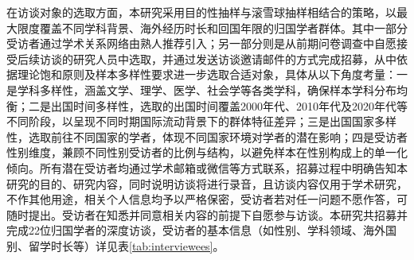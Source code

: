 在访谈对象的选取方面，本研究采用目的性抽样与滚雪球抽样相结合的策略，以最大限度覆盖不同学科背景、海外经历时长和回国年限的归国学者群体。其中一部分受访者通过学术关系网络由熟人推荐引入；另一部分则是从前期问卷调查中自愿接受后续访谈的研究人员中选取，并通过发送访谈邀请邮件的方式完成招募，从中依据理论饱和原则及样本多样性要求进一步选取合适对象，具体从以下角度考量：一是学科多样性，涵盖文学、理学、医学、社会学等各类学科，确保样本学科分布均衡；二是出国时间多样性，选取的出国时间覆盖2000年代、2010年代及2020年代等不同阶段，以呈现不同时期国际流动背景下的群体特征差异；三是出国国家多样性，选取前往不同国家的学者，体现不同国家环境对学者的潜在影响；四是受访者性别维度，兼顾不同性别受访者的比例与结构，以避免样本在性别构成上的单一化倾向。所有潜在受访者均通过学术邮箱或微信等方式联系，招募过程中明确告知本研究的目的、研究内容，同时说明访谈将进行录音，且访谈内容仅用于学术研究，不作其他用途，相关个人信息均予以严格保密，受访者若对任一问题不愿作答，可随时提出。受访者在知悉并同意相关内容的前提下自愿参与访谈。本研究共招募并完成22位归国学者的深度访谈，受访者的基本信息（如性别、学科领域、海外国别、留学时长等）详见表\ref{tab:interviewees}。

